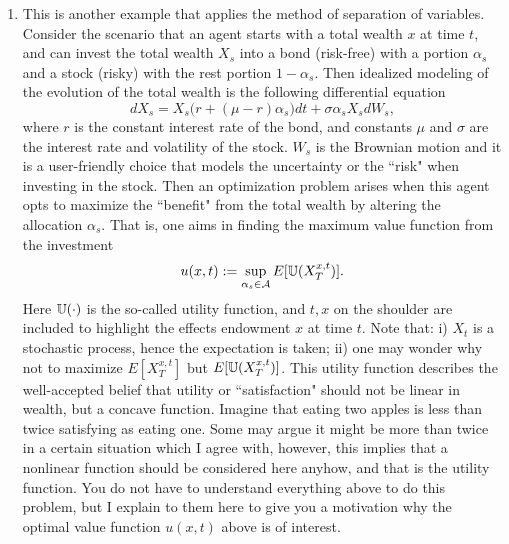 \documentclass[6pt]{article}
\numberwithin{equation}{section}
\def\mathbb{\Bbb}
\begin{document}
\begin{enumerate}
(iii)  Choose $D=L=1$.  Use the first 10 terms as your approximate.  Plot the graphs for $t=1, 1.5, 2, 2.5, 3$...and the initial data on the same coordinate.  What are your observations? Compare this with the heat equation.

(iv).  You can even try to plot the graphs for $t=-1$, $t=-2$, $t=-3$.  You may see that graphs propagate like a wave and this is why the PDE is called a wave equation.  What is the speed of wave propagation?

\item  This is another example that applies the method of separation of variables.  Consider the scenario that an agent starts with a total wealth $x$ at time $t$, and can invest the total wealth $X_s$ into a bond (risk-free) with a portion $\alpha_s$ and a stock (risky) with the rest portion $1-\alpha_s$.  Then idealized modeling of the evolution of the total wealth is the following differential equation
\[dX_s=X_s\big(r+(\mu-r)\alpha_s\big)dt+\sigma \alpha_sX_sdW_s,\]
where $r$ is the constant interest rate of the bond, and constants $\mu$ and $\sigma$ are the interest rate and volatility of the stock.  $W_s$ is the Brownian motion and it is a user-friendly choice that models the uncertainty or the ``risk" when investing in the stock.  Then an optimization problem arises when this agent opts to maximize the ``benefit" from the total wealth by altering the allocation $\alpha_s$.  That is, one aims in finding the maximum value function from the investment
\[u(x,t):=\sup_{\alpha_s\in\mathcal A}E[\mathbb U(X^{x,t}_T)].\]
Here $\mathbb U(\cdot)$ is the so-called utility function, and ${t,x}$ on the shoulder are included to highlight the effects endowment $x$ at time $t$.  Note that: i) $X_t$ is a stochastic process, hence the expectation is taken; ii) one may wonder why not to maximize $E[X^{x,t}_T]$ but $E[\mathbb U(X^{x,t}_T)]$.  This utility function describes the well-accepted belief that utility or ``satisfaction" should not be linear in wealth, but a concave function.  Imagine that eating two apples is less than twice satisfying as eating one.  Some may argue it might be more than twice in a certain situation which I agree with, however, this implies that a nonlinear function should be considered here anyhow, and that is the utility function.  You do not have to understand everything above to do this problem, but I explain to them here to give you a motivation why the optimal value function $u(x,t)$ above is of interest.


\end{enumerate}
\end{document}
